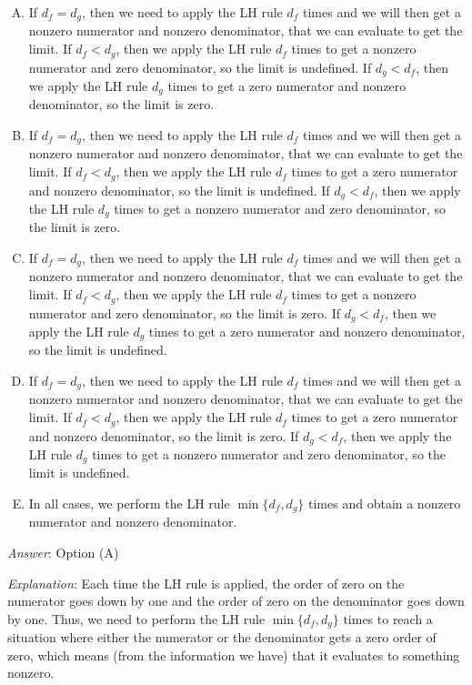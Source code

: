 \documentclass[10pt]{amsart}
\begin{document}
\begin{enumerate}
  \begin{enumerate}[(A)]
  \item If $d_f = d_g$, then we need to apply the LH rule $d_f$ times
    and we will then get a nonzero numerator and nonzero denominator,
    that we can evaluate to get the limit. If $d_f < d_g$, then we
    apply the LH rule $d_f$ times to get a nonzero numerator and zero
    denominator, so the limit is undefined. If $d_g < d_f$, then we
    apply the LH rule $d_g$ times to get a zero numerator and nonzero
    denominator, so the limit is zero.
  \item If $d_f = d_g$, then we need to apply the LH rule $d_f$ times
    and we will then get a nonzero numerator and nonzero denominator,
    that we can evaluate to get the limit. If $d_f < d_g$, then we
    apply the LH rule $d_f$ times to get a zero numerator and nonzero
    denominator, so the limit is undefined. If $d_g < d_f$, then we
    apply the LH rule $d_g$ times to get a nonzero numerator and zero
    denominator, so the limit is zero.
  \item If $d_f = d_g$, then we need to apply the LH rule $d_f$ times
    and we will then get a nonzero numerator and nonzero denominator,
    that we can evaluate to get the limit. If $d_f < d_g$, then we
    apply the LH rule $d_f$ times to get a nonzero numerator and zero
    denominator, so the limit is zero. If $d_g < d_f$, then we
    apply the LH rule $d_g$ times to get a zero numerator and nonzero
    denominator, so the limit is undefined.
  \item If $d_f = d_g$, then we need to apply the LH rule $d_f$ times
    and we will then get a nonzero numerator and nonzero denominator,
    that we can evaluate to get the limit. If $d_f < d_g$, then we
    apply the LH rule $d_f$ times to get a zero numerator and nonzero
    denominator, so the limit is zero. If $d_g < d_f$, then we
    apply the LH rule $d_g$ times to get a nonzero numerator and zero
    denominator, so the limit is undefined.
  \item In all cases, we perform the LH rule $\min \{ d_f, d_g \}$
    times and obtain a nonzero numerator and nonzero denominator.
  \end{enumerate}

  {\em Answer}: Option (A)

  {\em Explanation}: Each time the LH rule is applied, the order of
  zero on the numerator goes down by one and the order of zero on the
  denominator goes down by one. Thus, we need to perform the LH rule
  $\min \{ d_f, d_g \}$ times to reach a situation where either the
  numerator or the denominator gets a zero order of zero, which means
  (from the information we have) that it evaluates to something
  nonzero.


\end{enumerate}
\end{document}
